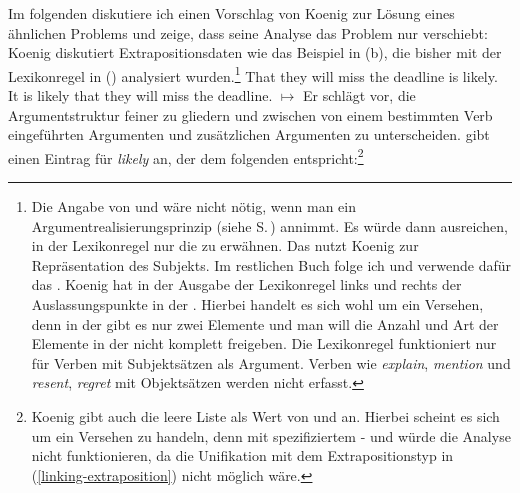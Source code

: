 Im folgenden diskutiere ich einen Vorschlag von Koenig zur Lösung eines ähnlichen Problems
und zeige, dass seine Analyse das Problem nur verschiebt:
Koenig diskutiert Extrapositionsdaten wie das Beispiel in (b), die bisher mit der
Lexikonregel in () analysiert wurden.\footnote{\label{fn-Extrapositionslexikonregel}%
  Die Angabe von \subj und \comps wäre nicht nötig, wenn man ein
  Argumentrealisierungsprinzip (siehe S.\,\pageref{Prinzip-Argumentrealisierung-einfach})
  annimmt. Es würde dann ausreichen, in der Lexikonregel nur die \argstl zu erwähnen. Das \subjm nutzt Koenig zur
  Repräsentation des Subjekts. Im restlichen Buch folge ich \citet*[Kapitel~4.3]{SWB2003a} und
  verwende dafür das \sprm. Koenig hat in der Ausgabe der Lexikonregel links und rechts der
   Auslassungspunkte in der \compsl. Hierbei handelt es sich wohl um ein Versehen, denn in
  der \argstl gibt es nur zwei Elemente und man will die Anzahl und Art der Elemente in der \compsl
  nicht komplett freigeben. Die Lexikonregel funktioniert nur für Verben mit Subjektsätzen als
  Argument. Verben wie \emph{explain}, \emph{mention} und \emph{resent}, \emph{regret} mit
  Objektsätzen \citep[--151]{ps2} werden nicht erfasst.%
}
\eal
\ex That they will miss the deadline is likely.
\ex It is likely that they will miss the deadline.
\zl
\ea
{} $\mapsto$ %
\z
Er schlägt vor, die Argumentstruktur feiner zu gliedern und zwischen von einem bestimmten
Verb eingeführten Argumenten und zusätzlichen Argumenten zu unterscheiden.
\citet[]{Koenig99a} gibt einen Eintrag für \emph{likely} an, der dem folgenden entspricht:\footnote{
  Koenig gibt auch die leere Liste als Wert von \subj und \comps an. Hierbei
  scheint es sich um ein Versehen zu handeln, denn mit spezifiziertem \subj- und \compsw
  würde die Analyse nicht funktionieren, da die Unifikation mit dem Extrapositionstyp in (\ref{linking-extraposition})
  nicht möglich wäre.%
}
\ea
